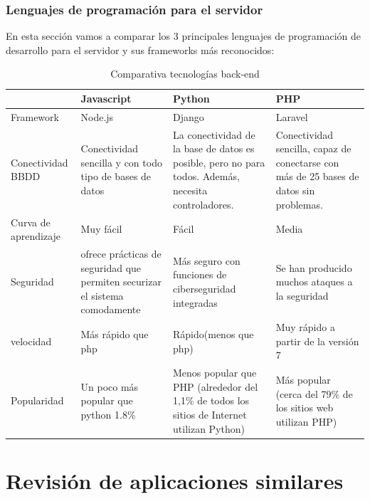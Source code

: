 \subsubsection{Lenguajes de programación para el servidor}
En esta sección vamos a comparar los 3 principales lenguajes de programación de desarrollo para el servidor y sus frameworks más reconocidos: 
\begin{table}[H] %
    \centering
    \begin{tabular}{|p{2cm} |p{3cm} |p{3cm} |p{3cm} |} \hline 
         &  \textbf{Javascript}&  \textbf{Python}& \textbf{PHP}\\  \hline 
         Framework &  Node.js &  Django & Laravel\\ \hline
         
        Conectividad BBDD &  Conectividad sencilla y con todo tipo de bases de datos&  La conectividad de la base de datos es posible, pero no para todos. Además, necesita controladores. & Conectividad sencilla, capaz de conectarse con más de 25 bases de datos sin problemas.\\ \hline 
        Curva de aprendizaje &  Muy fácil & Fácil & Media\\ \hline 
        Seguridad &  ofrece prácticas de seguridad que permiten securizar el sistema comodamente &  Más seguro con funciones de ciberseguridad integradas & Se han producido muchos ataques a la seguridad	\\ \hline 
        velocidad &  Más rápido que php &  Rápido(menos que php) & Muy rápido a partir de la versión 7\\ \hline 
        Popularidad & Un poco más popular que python 1.8\% &  Menos popular que PHP (alrededor del 1,1\% de todos los sitios de Internet utilizan Python) & Más popular (cerca del 79\% de los sitios web utilizan PHP)\\ \hline 
    \end{tabular}
    \caption{Comparativa tecnologías back-end }
    \label{tab:tec_back}
\end{table}

\pagebreak
\section{Revisión de aplicaciones similares} \label{appssimilares}

